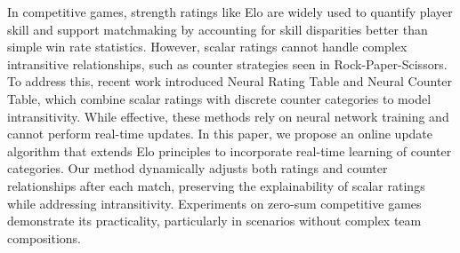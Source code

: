 In competitive games, strength ratings like Elo are widely used to quantify player skill and support matchmaking by accounting for skill disparities better than simple win rate statistics. However, scalar ratings cannot handle complex intransitive relationships, such as counter strategies seen in Rock-Paper-Scissors. To address this, recent work introduced Neural Rating Table and Neural Counter Table, which combine scalar ratings with discrete counter categories to model intransitivity. While effective, these methods rely on neural network training and cannot perform real-time updates. In this paper, we propose an online update algorithm that extends Elo principles to incorporate real-time learning of counter categories. Our method dynamically adjusts both ratings and counter relationships after each match, preserving the explainability of scalar ratings while addressing intransitivity. Experiments on zero-sum competitive games demonstrate its practicality, particularly in scenarios without complex team compositions.